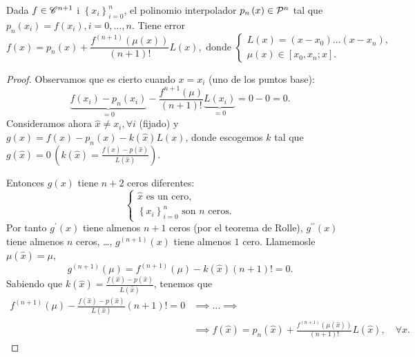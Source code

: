 \begin{teo}
    Dada $f\in \mathscr{C}^{n+1}$ i $\left\{ x_i \right\}_{i=0}^n$, el polinomio interpolador $p_n\left( x \right)\in \mathcal{P}^n$ tal que $p_n\left( x_i \right) = f\left( x_i \right), i=0,\dots,n$. Tiene error
    \[
        f\left( x \right) = p_n\left( x \right) + \frac{f^{\left( n+1 \right)}\left( \mu\left( x \right) \right)}{\left( n+1 \right)!}L\left( x \right), \text{ donde }
        \begin{cases}
            L\left( x \right) = \left( x-x_0 \right) \dots \left( x-x_n \right), \\
            \mu\left( x \right) \in \left[ x_0, x_n; x \right].
        \end{cases}
    \]
\end{teo}

\begin{proof}
    Observamos que es cierto cuando $x=x_i$ (uno de los puntos base):
    \[
        \underbrace{f\left( x_i \right) - p_n\left( x_i \right)}_{=0} - \frac{f^{n+1}\left( \mu \right)}{\left( n+1 \right)!}\underbrace{L\left( x_i \right)}_{=0} = 0-0 = 0.
    \]
    Consideramos ahora $\hat{x} \neq x_i, \forall i$ (fijado) y $g\left( x \right) = f\left( x \right) - p_n\left( x \right) - k\left( \hat{x} \right)L\left( x \right)$, donde escogemos $k$ tal que $g\left( \hat{x} \right) = 0\, \left( k\left( \hat{x} \right) = \frac{f\left( \hat{x} \right) - p\left( \hat{x} \right)}{L\left( \hat{x} \right)} \right)$.
    
    \noindent Entonces $g\left( x \right)$ tiene $n+2$ ceros diferentes:
    \[
        \begin{cases}
            \hat{x} \text{ es un cero},\\
            \left\{ x_i \right\}_{i=0}^n \text{ son }n\text{ ceros}.
        \end{cases}
    \]
    Por tanto $g^{\prime}\left( x \right)$ tiene almenos $n+1$ ceros (por el teorema de Rolle), $g^{\prime\prime}\left( x \right)$ tiene almenos $n$ ceros, \dots, $g^{\left( n+1 \right)} \left( x \right)$ tiene almenos $1$ cero. Llamemosle $\mu\left( \hat{x} \right) = \mu$,
    \[
        g^{\left( n+1 \right)}\left( \mu \right) = f^{\left( n+1 \right)}\left( \mu \right) - k\left( \hat{x} \right)\left( n+1 \right)! = 0.
    \]
    Sabiendo que $k\left( \hat{x} \right) = \frac{f\left( \hat{x} \right) - p\left( \hat{x} \right)}{L\left( \hat{x} \right)}$, tenemos que
    \begin{align*}
        f^{\left( n+1 \right)}\left( \mu \right) - \frac{f\left( \hat{x} \right) - p\left( \hat{x} \right)}{L\left( \hat{x} \right)}\left( n+1 \right)! = 0 &\implies \dots \implies\\
        &\implies f\left( \hat{x} \right) = p_n\left( \hat{x} \right) + \frac{f^{\left( n+1 \right)}\left( \mu\left( \hat{x} \right) \right)}{\left( n+1 \right)!}L\left( \hat{x} \right),\quad \forall \hat{x}.
    \end{align*}
\end{proof}

